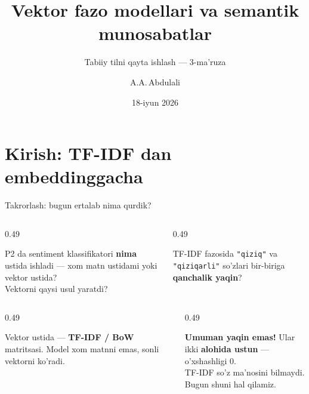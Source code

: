 \documentclass[aspectratio=169,11pt]{beamer}
\title[Vektor fazo va embeddinglar]{Vektor fazo modellari va semantik munosabatlar}
\subtitle{Tabiiy tilni qayta ishlash --- 3-ma'ruza}
\author[A.A.\,Abdulali]{A.A.\,Abdulali}
\date{18-iyun 2026}
\institute{11:00--12:20 \quad$\cdot$\quad mavzu \textnumero{}3}
\begin{document}

\maketitle

\section[Kirish]{Kirish: TF-IDF dan embeddinggacha}

\begin{frame}{Takrorlash: bugun ertalab nima qurdik?}
  \begin{columns}[T]
    \begin{column}{0.49\textwidth}
      \begin{tcolorbox}[warnbox,title=1-savol]
        \small
        P2 da sentiment klassifikatori \textbf{nima} ustida ishladi ---
        xom matn ustidami yoki vektor ustida?\\[3pt]
        \footnotesize Vektorni qaysi usul yaratdi?
      \end{tcolorbox}
    \end{column}
    \begin{column}{0.49\textwidth}
      \begin{tcolorbox}[warnbox,title=2-savol]
        \small
        TF-IDF fazosida \texttt{"qiziq"} va \texttt{"qiziqarli"}
        so'zlari bir-biriga \textbf{qanchalik yaqin}?
      \end{tcolorbox}
    \end{column}
  \end{columns}
  \pause
  \vspace{4pt}
  \begin{columns}[T]
    \begin{column}{0.49\textwidth}
      \begin{tcolorbox}[okbox,title=1-javob]
        \small
        Vektor ustida --- \textbf{TF-IDF / BoW} matritsasi.
        Model xom matnni emas, sonli vektorni ko'radi.
      \end{tcolorbox}
    \end{column}
    \begin{column}{0.49\textwidth}
      \begin{tcolorbox}[okbox,title=2-javob]
        \small
        \textbf{Umuman yaqin emas!} Ular ikki \textbf{alohida ustun} ---
        o'xshashligi $0$.\\
        \footnotesize\textcolor{halfgray}{TF-IDF so'z ma'nosini bilmaydi. Bugun shuni hal qilamiz.}
      \end{tcolorbox}
    \end{column}
  \end{columns}
\end{frame}
\end{document}
